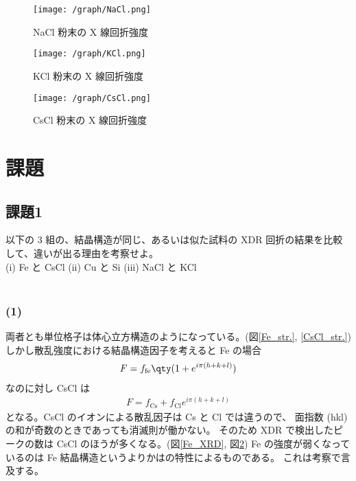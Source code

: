 \documentclass[11pt,dvipdfmx,a4paper]{jsarticle}
\begin{document}
\begin{figure}[H]
	\centering
	\begin{minipage}[t]{0.48\columnwidth}
		\centering
		\texttt{[image: /graph/NaCl.png]}
		\caption{NaCl 粉末の X 線回折強度}
		\label{NaCl_XRD}
	\end{minipage}
	\hfil
	\begin{minipage}[t]{0.48\columnwidth}
		\centering
		\texttt{[image: /graph/KCl.png]}
		\caption{KCl 粉末の X 線回折強度}
		\label{KCl_XRD}
	\end{minipage}
\end{figure}
\begin{figure}[H]
	\centering
	\begin{minipage}[t]{0.48\columnwidth}
		\centering
		\texttt{[image: /graph/CsCl.png]}
		\caption{CsCl 粉末の X 線回折強度}
		\label{CsCl_XRD}
	\end{minipage}
\end{figure}

\section{課題}
\subsection*{課題1}
以下の 3 組の、結晶構造が同じ、あるいは似た試料の XDR 回折の結果を比較して、違いが出る理由を考察せよ。\\
(i) Fe と CsCl \quad (ii) Cu と Si \quad (iii) NaCl と KCl\\ \\

\subsubsection*{(1)}
両者とも単位格子は体心立方構造のようになっている。(図\ref{Fe_str.}, \ref{CsCl_str.})
しかし散乱強度における結晶構造因子を考えると Fe の場合
\begin{align}
	F = f_{\text{fe}}\qty(1+e^{i\pi(h+k+l)})
\end{align}
なのに対し CsCl は
\begin{align}
	F = f_{\text{Cs}}+f_{\text{Cl}}e^{i\pi(h+k+l)}
\end{align}
となる。CsCl のイオンによる散乱因子は Cs と Cl では違うので、
面指数 (hkl) の和が奇数のときであっても消滅則が働かない。
そのため XDR で検出したピークの数は CsCl のほうが多くなる。(図\ref{Fe_XRD}, 図\ref{CsCl_XRD})
Fe の強度が弱くなっているのは Fe 結晶構造というよりかはの特性によるものである。
これは考察で言及する。\\
\end{document}
